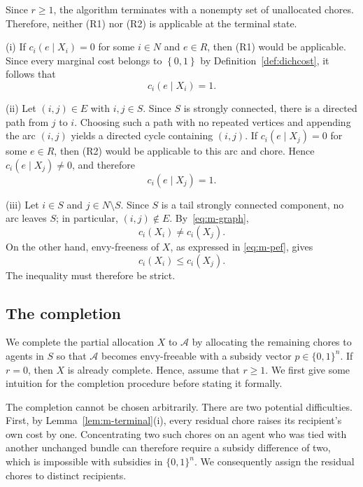 \documentclass[11pt]{article}
\makeatletter
\theoremstyle{plain}
\theoremstyle{plain}
\renewenvironment{proof}[1][\proofname]{\par
  \pushQED{\qed}%
  \normalfont \topsep6\p@\@plus6\p@\relax
  \trivlist
  \item[\hskip\labelsep\bfseries #1\@addpunct{}]\ignorespaces
}{%
  \popQED\endtrivlist\@endpefalse
}
\newcommand{\agents}{N}                       %
\newcommand{\cost}{c}
\newcommand{\set}[1]{\left\{#1\right\}}
\makeatother
\begin{document}
\begin{proof} Since $r\geq 1$, the algorithm terminates with a nonempty set of unallocated chores. Therefore, neither \textnormal{(R1)} nor \textnormal{(R2)} is applicable at the terminal state.

(i) If $\cost_i(e\mid X_i)=0$ for some $i\in\agents$ and $e\in R$, then \textnormal{(R1)} would be applicable. Since every marginal cost belongs to $\set{0,1}$ by Definition~\ref{def:dichcost}, it follows that
\[
    \cost_i(e\mid X_i)=1.
\]

(ii) Let $(i,j)\in E$ with $i,j\in S$. Since $S$ is strongly connected, there is a directed path from $j$ to $i$. Choosing such a path with no repeated vertices and appending the arc $(i,j)$ yields a directed cycle containing $(i,j)$. If $\cost_i(e\mid X_j)=0$ for some $e\in R$, then \textnormal{(R2)} would be applicable to this arc and chore. Hence $\cost_i(e\mid X_j)\neq 0$, and therefore
\[
    \cost_i(e\mid X_j)=1.
\]

(iii) Let $i\in S$ and $j\in\agents\setminus S$. Since $S$ is a tail strongly connected component, no arc leaves $S$; in particular, $(i,j)\notin E$. By~\eqref{eq:m-graph},
\[
    \cost_i(X_i)\neq \cost_i(X_j).
\]
On the other hand, envy-freeness of $X$, as expressed in \eqref{eq:m-pef}, gives
\[
    \cost_i(X_i)\leq \cost_i(X_j).
\]
The inequality must therefore be strict.
\end{proof}
\subsection{The completion}
\label{sec:m-completion}
We complete the partial allocation $X$ to $\mathcal{A}$ by allocating the remaining chores to agents in $S$ so that $\mathcal{A}$ becomes envy-freeable with a subsidy vector $p\in\{0,1\}^n$. If $r=0$, then $X$ is already complete. Hence, assume that $r\geq 1$. We first give some intuition for the completion procedure before stating it formally.

The completion cannot be chosen arbitrarily. There are two potential difficulties. First, by Lemma~\ref{lem:m-terminal}(i), every residual chore raises its recipient's own cost by one. Concentrating two such chores on an agent who was tied with another unchanged bundle can therefore require a subsidy difference of two, which is impossible with subsidies in $\{0,1\}^n$. We consequently assign the residual chores to distinct recipients.
\end{document}
